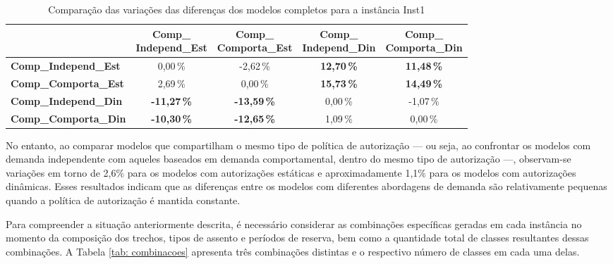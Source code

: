 \begin{table}[H]
	\centering
	\footnotesize
	\renewcommand{\arraystretch}{1.1}
	\begin{tabular}{@{}lcccc@{}}
		\toprule
		                             & \makecell[c]{\textbf{Comp\_}                                                                 \\\textbf{Independ\_Est}}
		                             & \makecell[c]{\textbf{Comp\_}                                                                 \\\textbf{Comporta\_Est}}
		                             & \makecell[c]{\textbf{Comp\_}                                                                 \\\textbf{Independ\_Din}}
		                             & \makecell[c]{\textbf{Comp\_}                                                                 \\\textbf{Comporta\_Din}} \\
		\midrule
		\textbf{Comp\_Independ\_Est} & 0,00\,\%                     & -2,62\,\%           & \textbf{12,70\,\%} & \textbf{11,48\,\%} \\
		\textbf{Comp\_Comporta\_Est} & 2,69\,\%                     & 0,00\,\%            & \textbf{15,73\,\%} & \textbf{14,49\,\%} \\
		\textbf{Comp\_Independ\_Din} & \textbf{-11,27\,\%}          & \textbf{-13,59\,\%} & 0,00\,\%           & -1,07\,\%          \\
		\textbf{Comp\_Comporta\_Din} & \textbf{-10,30\,\%}           & \textbf{-12,65\,\%} & 1,09\,\%           & 0,00\,\%           \\
		\bottomrule
	\end{tabular}
	\caption{Comparação das variações das diferenças dos modelos completos para a instância Inst1}
	\label{tab: variaciones_Inst1}
\end{table}

No entanto, ao comparar modelos que compartilham o mesmo tipo de política de autorização — ou seja, ao confrontar os modelos com demanda independente com aqueles baseados em demanda comportamental, dentro do mesmo tipo de autorização —, observam-se variações em torno de 2,6\% para os modelos com autorizações estáticas e aproximadamente 1,1\% para os modelos com autorizações dinâmicas. Esses resultados indicam que as diferenças entre os modelos com diferentes abordagens de demanda são relativamente pequenas quando a política de autorização é mantida constante.

Para compreender a situação anteriormente descrita, é necessário considerar as combinações específicas geradas em cada instância no momento da composição dos trechos, tipos de assento e períodos de reserva, bem como a quantidade total de classes resultantes dessas combinações. A Tabela \ref{tab: combinacoes} apresenta três combinações distintas e o respectivo número de classes em cada uma delas.


